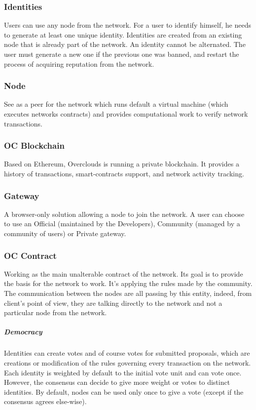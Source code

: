 \subsubsection{Identities} Users can use any node from the network. For a user to identify himself, he needs to generate at least one unique identity. Identities are created from an existing node that is already part of the network. An identity cannot be alternated. The user must generate a new one if the previous one was banned, and restart the process of acquiring reputation from the network.

\subsubsection{Node} See as a peer for the network which runs default a virtual machine (which executes networks contracts) and provides computational work to verify network transactions.

\subsubsection{OC Blockchain} Based on Ethereum\cite{VitalikButerin2013APlatform}, Overclouds is running a private blockchain. It provides a history of transactions, smart-contracts support, and network activity tracking.

\subsubsection{Gateway} A browser-only solution allowing a node to join the network. A user can choose to use an Official (maintained by the Developers), Community (managed by a community of users) or Private gateway.

\subsubsection{OC Contract} Working as the main unalterable contract of the network. Its goal is to provide the basis for the network to work. It's applying the rules made by the community. The communication between the nodes are all passing by this entity, indeed, from client's point of view, they are talking directly to the network and not a particular node from the network. 

\subparagraph{Democracy} Identities can create votes and of course votes for submitted proposals, which are creations or modification of the rules governing every transaction on the network. Each identity is weighted by default to the initial vote unit and can vote once. However, the consensus can decide to give more weight or votes to distinct identities. By default, nodes can be used only once to give a vote (except if the consensus agrees else-wise).

